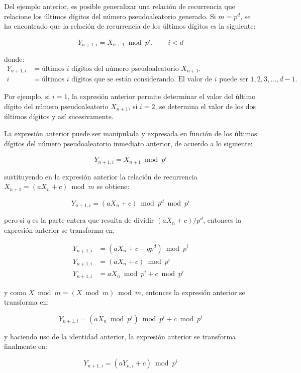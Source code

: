 \documentclass[11pt,letterpaper]{report}
\begin{document}
Del ejemplo anterior, es posible generalizar una relación de recurrencia
que relacione los últimos dígitos del número pseudoaleatorio generado.
Si $m=p^d$, se ha encontrado que la relación de recurrencia de los
últimos dígitos es la siguiente:

\begin{equation}
Y_{n+1,i} = X_{n+1} \bmod p^i, \qquad i < d
\end{equation}

donde:
\begin{align*}
Y_{n+1,i} &= \text{últimos } i \text{ dígitos del número pseudoaleatorio } X_{n+1}. \\
i &= \text{últimos } i \text{ dígitos que se están considerando. El valor de } i \text{ puede ser } 1, 2, 3, \ldots, d-1.
\end{align*}

Por ejemplo, si $i=1$, la expresión anterior permite determinar el valor
del último dígito del número pseudoaleatorio $X_{n+1}$, si $i=2$, se
determina el valor de los dos últimos dígitos y así sucesivamente.

La expresión anterior puede ser manipulada y expresada en función de los
últimos dígitos del número pseudoaleatorio inmediato anterior, de
acuerdo a lo siguiente:

\[
Y_{n+1,i} = X_{n+1} \bmod p^i
\]

sustituyendo en la expresión anterior la relación de recurrencia
$X_{n+1} = (aX_n+c) \bmod m$ se obtiene:

\[
Y_{n+1,i} = (aX_n + c) \bmod p^d \bmod p^i
\]

pero si $q$ es la parte entera que resulta de dividir $(aX_n+c)/p^d$,
entonces la expresión anterior se transforma en:

\begin{align*}
Y_{n+1,i} &= (aX_n + c - qp^d) \bmod p^i \\
Y_{n+1,i} &= (aX_n + c) \bmod p^i \\
Y_{n+1,i} &= aX_n \bmod p^i + c \bmod p^i
\end{align*}

y como $X \bmod m = (X \bmod m) \bmod m$, entonces la expresión anterior
se transforma en:

\[
Y_{n+1,i} = (aX_n \bmod p^i) \bmod p^i + c \bmod p^i
\]

y haciendo uso de la identidad anterior, la expresión anterior se
transforma finalmente en:

\begin{equation}
Y_{n+1,i} = (aY_{n,i} + c) \bmod p^i
\end{equation}
\end{document}
